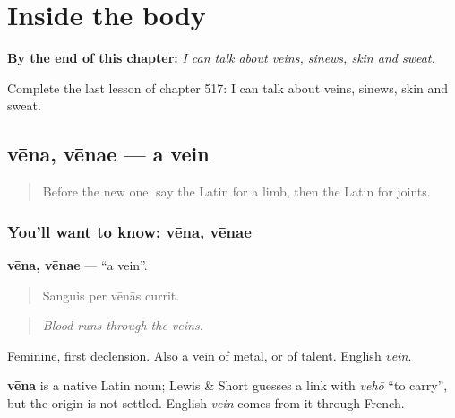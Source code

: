 
\chapter{Inside the body}
\label{ch:la-inside-the-body}

\begin{chapteropening}
\textbf{By the end of this chapter:} \emph{I can talk about veins, sinews, skin and sweat.}

Complete the last lesson of chapter 517: I can talk about veins, sinews, skin and sweat.
\end{chapteropening}

\section[vēna, vēnae]{vēna, vēnae — a vein}

\label{lesson:LA-C517-vena}



\begin{quote}
Before the new one: say the Latin for a limb, then the Latin for joints.
\end{quote}

\subsection*{You'll want to know: vēna, vēnae}
\textbf{vēna, vēnae} — \textquotedblleft{}a vein\textquotedblright{}.

\begin{quote}
Sanguis per vēnās currit.
\end{quote}

\begin{quote}
\emph{Blood runs through the veins.}
\end{quote}

Feminine, first declension. Also a vein of metal, or of talent. English \emph{vein}.

\begin{cousinweb}
\textbf{vēna} is a native Latin noun; Lewis \& Short guesses a link with \emph{vehō} \textquotedblleft{}to carry\textquotedblright{}, but the origin is not settled. English \emph{vein} comes from it through French.
\end{cousinweb}


